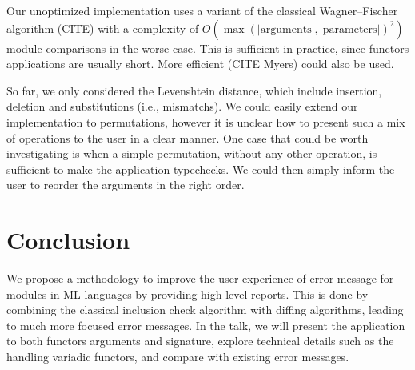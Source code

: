 \documentclass[a4paper,11pt]{scrartcl}
\begin{document}
Our unoptimized implementation uses a variant of the classical
Wagner–Fischer algorithm (CITE) with a complexity of
$O(\max(\mathrm{|arguments|,|parameters|})^2)$ module comparisons in the worse case.
This is sufficient in practice, since functors applications are usually short.
More efficient (CITE Myers) could also be used.

So far, we only considered the Levenshtein distance, which include
insertion, deletion and substitutions (i.e., mismatchs). We could easily extend
our implementation to permutations, however it is unclear how to present
such a mix of operations to the user in a clear manner.
One case that could be worth investigating is when a simple permutation,
without any other operation,
is sufficient to make the application typechecks. We could then simply
inform the user to reorder the arguments in the right order.



\section{Conclusion}

We propose a methodology to improve the user experience of error message for modules in ML languages by providing high-level reports.
This is done by combining the classical
inclusion check algorithm with diffing algorithms, leading to much more
focused error messages.
In the talk, we will present the application to both functors arguments and
signature, explore technical details such as the handling variadic functors,
and compare with existing error messages.
\end{document}
